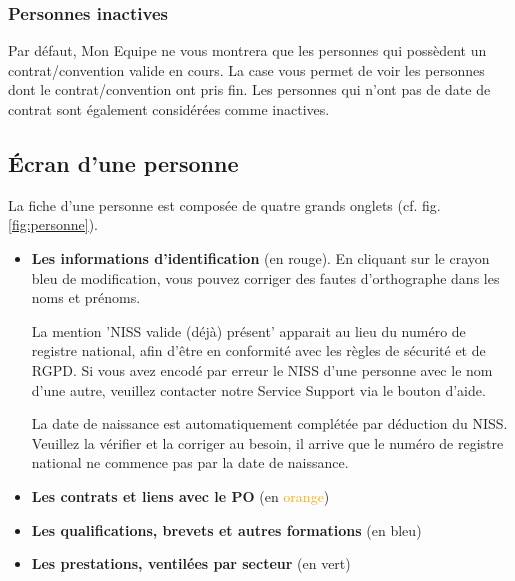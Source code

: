 \subsubsection{Personnes inactives}
Par défaut, Mon Equipe ne vous montrera que les personnes qui possèdent un contrat/convention valide en cours. La case  vous permet de voir les personnes dont le contrat/convention ont pris fin. Les personnes qui n'ont pas de date de contrat sont également considérées comme inactives.


\subsection{Écran d'une personne}
La fiche d'une personne est composée de quatre grands onglets (cf. fig. \ref{fig:personne}).

\begin{itemize}
    \item \textbf{Les informations d'identification} (en \textcolor{rouge}{rouge}). En cliquant sur le crayon bleu de modification, vous pouvez corriger des fautes d'orthographe dans les noms et prénoms. 
    
    La mention 'NISS valide (déjà) présent' apparait au lieu du numéro de registre national, afin d'être en conformité avec les règles de sécurité et de RGPD. Si vous avez encodé par erreur le NISS d'une personne avec le nom d'une autre, veuillez contacter notre Service Support via le bouton d'aide.
    
    La date de naissance est automatiquement complétée par déduction du NISS. Veuillez la vérifier et la corriger au besoin, il arrive que le numéro de registre national ne commence pas par la date de naissance.
    
 

    \item \textbf{Les contrats et liens avec le PO} (en \textcolor{orange}{orange})
    \item \textbf{Les qualifications, brevets et autres formations} (en \textcolor{bleu}{bleu})
    \item \textbf{Les prestations, ventilées par secteur} (en \textcolor{vert}{vert})
\end{itemize}


